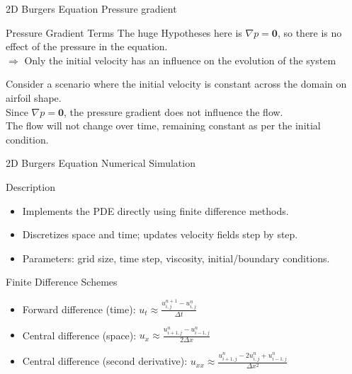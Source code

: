 \begin{frame}{2D Burgers Equation}
\small
\textcolor{red_unipd}{\Large Pressure gradient}

\vspace{0.6em}

\begin{alertblock}{Pressure Gradient Terms}
  The huge Hypotheses here is \(\nabla p=\mathbf{0}\), so there is no effect of the pressure in the equation. \\
  \( \Rightarrow \) Only the initial velocity has an influence on the evolution of the system
\end{alertblock}

\begin{example}
  Consider a scenario where the initial velocity is constant across the domain on airfoil shape. \\
  Since \(\nabla p=\mathbf{0}\), the pressure gradient does not influence the flow. \\
  The flow will not change over time, remaining constant as per the initial condition.
\end{example}



\end{frame}

\begin{frame}{2D Burgers Equation}
\small
\textcolor{red_unipd}{\Large Numerical Simulation}

\vspace{0.6em}

\begin{block}{Description}
\begin{itemize}
  \item Implements the PDE directly using finite difference methods.
  \item Discretizes space and time; updates velocity fields step by step.
  \item Parameters: grid size, time step, viscosity, initial/boundary conditions.
\end{itemize}
\end{block}

\begin{alertblock}{Finite Difference Schemes}
\begin{itemize}
  \item Forward difference (time): $u_t \approx \frac{u_{i,j}^{n+1} - u_{i,j}^n}{\Delta t}$
  \item Central difference (space): $u_x \approx \frac{u_{i+1,j}^n - u_{i-1,j}^n}{2\Delta x}$
  \item Central difference (second derivative): $u_{xx} \approx \frac{u_{i+1,j}^n - 2u_{i,j}^n + u_{i-1,j}^n}{\Delta x^2}$
\end{itemize}
\end{alertblock}

\end{frame}

